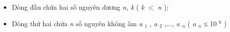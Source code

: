 \begin{itemize}
	\item Dòng đầu chứa hai số nguyên dương \emph{ n, k } ( \emph{ k } $<$ \emph{ n } );
	\item Dòng thứ hai chứa \emph{ n } số nguyên không âm \emph{ a }$_ 1 $ , \emph{ a }$_ 2 $ ,..., \emph{ a $_ n $} ( \emph{ a $_ n $} ≤ 10 $^ 6 $ )
\end{itemize}